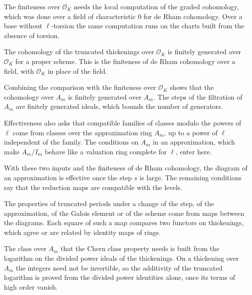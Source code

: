 The finiteness over $\mathcal O_K$ needs the local computation of the graded cohomology, which was done over a field of
characteristic $0$ for de Rham cohomology. Over a base without $\ell$-torsion the same computation runs on the charts
built from the absence of torsion.

The cohomology of the truncated thickenings over $\mathcal O_K$ is finitely generated over $\mathcal O_K$ for a proper
scheme. This is the finiteness of de Rham cohomology over a field, with $\mathcal O_K$ in place of the field.

Combining the comparison with the finiteness over $\mathcal O_K$ shows that the cohomology over $A_m$ is finitely
generated over $A_m$. The steps of the filtration of $A_m$ are finitely generated ideals, which bounds the number of
generators.

Effectiveness also asks that compatible families of classes modulo the powers of $\ell$ come from classes over the
approximation ring $A_m$, up to a power of $\ell$ independent of the family. The conditions on $A_m$ in an approximation,
which make $A_m/I_m$ behave like a valuation ring complete for $\ell$, enter here.

With these two inputs and the finiteness of de Rham cohomology, the diagram of an approximation is effective once the
step $s$ is large. The remaining conditions say that the reduction maps are compatible with the levels.

The properties of truncated periods under a change of the step, of the approximation, of the Galois element or of the
scheme come from maps between the diagrams. Each square of such a map compares two functors on thickenings, which agree
or are related by identity maps of rings.

The class over $A_m$ that the Chern class property needs is built from the logarithm on the divided power ideals of the
thickenings. On a thickening over $A_m$ the integers need not be invertible, so the additivity of the truncated
logarithm is proved from the divided power identities alone, once its terms of high order vanish.

